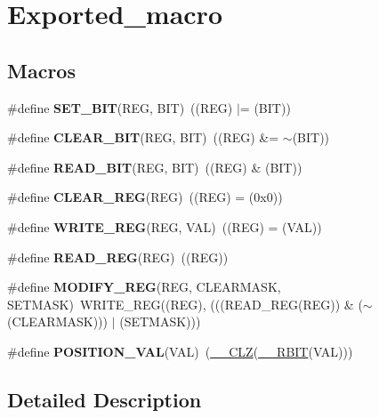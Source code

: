 \hypertarget{group___exported__macro}{}\section{Exported\+\_\+macro}
\label{group___exported__macro}
\subsection*{Macros}
\begin{DoxyCompactItemize}
\item 
\mbox{\label{group___exported__macro_ga26474f43799fbade9cf300e21dd3a91a}} 
\#define {\bfseries S\+E\+T\+\_\+\+B\+IT}(R\+EG,  B\+IT)~((R\+EG) $\vert$= (B\+IT))
\item 
\mbox{\label{group___exported__macro_ga133aae6fc0d41bffab39ab223a7001de}} 
\#define {\bfseries C\+L\+E\+A\+R\+\_\+\+B\+IT}(R\+EG,  B\+IT)~((R\+EG) \&= $\sim$(B\+IT))
\item 
\mbox{\label{group___exported__macro_ga822bb1bb9710d5f2fa6396b84e583c33}} 
\#define {\bfseries R\+E\+A\+D\+\_\+\+B\+IT}(R\+EG,  B\+IT)~((R\+EG) \& (B\+IT))
\item 
\mbox{\label{group___exported__macro_ga1378fbdda39f40b85420df55f41460ef}} 
\#define {\bfseries C\+L\+E\+A\+R\+\_\+\+R\+EG}(R\+EG)~((R\+EG) = (0x0))
\item 
\mbox{\label{group___exported__macro_ga32f78bffcaf6d13023dcd7f05e0c4d57}} 
\#define {\bfseries W\+R\+I\+T\+E\+\_\+\+R\+EG}(R\+EG,  V\+AL)~((R\+EG) = (V\+AL))
\item 
\mbox{\label{group___exported__macro_gae7f188a4d26c9e713a48414783421071}} 
\#define {\bfseries R\+E\+A\+D\+\_\+\+R\+EG}(R\+EG)~((R\+EG))
\item 
\mbox{\label{group___exported__macro_ga6553c99f510c3bab8cc0a91602053247}} 
\#define {\bfseries M\+O\+D\+I\+F\+Y\+\_\+\+R\+EG}(R\+EG,  C\+L\+E\+A\+R\+M\+A\+SK,  S\+E\+T\+M\+A\+SK)~W\+R\+I\+T\+E\+\_\+\+R\+EG((R\+EG), (((R\+E\+A\+D\+\_\+\+R\+EG(R\+EG)) \& ($\sim$(C\+L\+E\+A\+R\+M\+A\+SK))) $\vert$ (S\+E\+T\+M\+A\+SK)))
\item 
\mbox{\label{group___exported__macro_ga47a8870d71d55cefb3df47cd8c815ec8}} 
\#define {\bfseries P\+O\+S\+I\+T\+I\+O\+N\+\_\+\+V\+AL}(V\+AL)~(\hyperlink{group___c_m_s_i_s___core___instruction_interface_ga5d5bb1527e042be4a9fa5a33f65cc248}{\+\_\+\+\_\+\+C\+LZ}(\hyperlink{group___c_m_s_i_s___core___instruction_interface_gaf944a7b7d8fd70164cca27669316bcf7}{\+\_\+\+\_\+\+R\+B\+IT}(V\+AL)))
\end{DoxyCompactItemize}


\subsection{Detailed Description}
